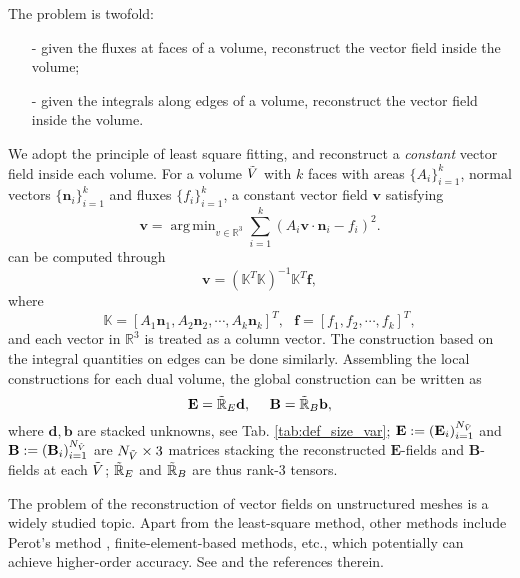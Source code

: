 \documentclass{article}
\DeclareMathOperator*{\argmin}{arg\,min}
\begin{document}
The problem is twofold:
\begin{itemize}
    \item[-] given the fluxes at faces of a volume, reconstruct the vector field inside the volume;
    \item[-] given the integrals along edges of a volume, reconstruct the vector field inside the volume. 
\end{itemize}
We adopt the principle of least square fitting, and reconstruct a \emph{constant} vector field inside each volume. For a volume $\Tilde{V}$ with $k$ faces with areas $\{A_i\}_{i=1}^k$, normal vectors $\{\mathbf{n}_i\}_{i=1}^k$ and fluxes $\{f_i\}_{i=1}^k$, a constant vector field $\mathbf{v}$ satisfying 
\begin{equation*}
    \mathbf{v} = \argmin_{v\in \mathbb{R}^3} \sum_{i=1}^k(A_i\mathbf{v} \cdot \mathbf{n}_i - f_i)^2.   
\end{equation*} can be computed through
\begin{equation*}
    \mathbf{v} = (\mathbb{K}^T\mathbb{K})^{-1}\mathbb{K}^T\mathbf{f},
\end{equation*}
where
\begin{equation*}
    \mathbb{K} = [A_1\mathbf{n}_1, A_2\mathbf{n}_2, \cdots, A_k\mathbf{n}_k]^T,\ \ \ \mathbf{f} = [f_1, f_2, \cdots, f_k]^T,
\end{equation*}
and each vector in $\mathbb{R}^3$ is treated as a column vector. The construction based on the integral quantities on edges can be done similarly. Assembling the local constructions for each dual volume, the global construction can be written as 
\begin{equation}
    \mathbf{E} = \Tilde{\mathbb{R}}_E\mathbf{d},
    \ \ \ \ 
    \mathbf{B} = \Tilde{\mathbb{R}}_B\mathbf{b},
\end{equation}
where $\mathbf{d}, \mathbf{b}$ are stacked unknowns, see Tab. \ref{tab:def_size_var}; $\mathbf{E} := (\mathbf{E}_i)_{i=1}^{N_{\Tilde{V}}}$ and $\mathbf{B} := (\mathbf{B}_i)_{i=1}^{N_{\Tilde{V}}}$ are $N_{\Tilde{V}} \times 3$ matrices stacking the reconstructed $\mathbf{E}$-fields and $\mathbf{B}$-fields at each $\Tilde{V}$; $\Tilde{\mathbb{R}}_E$ and $\Tilde{\mathbb{R}}_B$ are thus rank-3 tensors.

The problem of the reconstruction of vector fields on unstructured meshes is a widely studied topic. Apart from the least-square method, other methods include Perot's method \citep{perot_2000}, finite-element-based methods, etc., which potentially can achieve higher-order accuracy. See \cite[][sec. 3.4.4]{fuchs_2021} and the references therein.  
\end{document}
